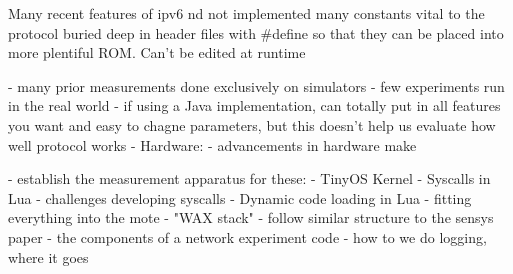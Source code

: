 Many recent features of  ipv6 nd not implemented
many constants vital to the protocol buried deep in header files with #define so that they
  can be placed into more plentiful ROM. Can't be edited at runtime
\fi

- many prior measurements done exclusively on simulators
    - few experiments run in the real world
    - if using a Java implementation, can totally put in all features you want and
      easy to chagne parameters, but this doesn't help us evaluate how well protocol works
- Hardware:
    - advancements in hardware make


- establish the measurement apparatus for these:
    - TinyOS Kernel
    - Syscalls in Lua
        - challenges developing syscalls
    - Dynamic code loading in Lua
    - fitting everything into the mote
    - "WAX stack"
        - follow similar structure to the sensys paper
        - the components of a network experiment code
        - how to we do logging, where it goes
\fi
